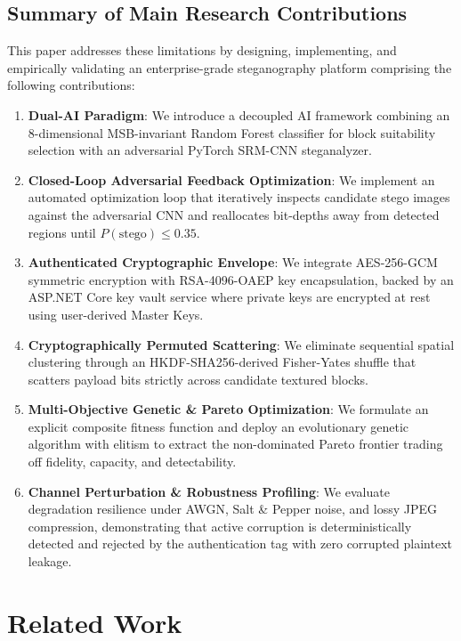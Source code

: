 \documentclass[conference]{IEEEtran}
\begin{document}
\subsection{Summary of Main Research Contributions}
This paper addresses these limitations by designing, implementing, and empirically validating an enterprise-grade steganography platform comprising the following contributions:
\begin{enumerate}
    \item \textbf{Dual-AI Paradigm}: We introduce a decoupled AI framework combining an 8-dimensional MSB-invariant Random Forest classifier for block suitability selection with an adversarial PyTorch SRM-CNN steganalyzer.
    \item \textbf{Closed-Loop Adversarial Feedback Optimization}: We implement an automated optimization loop that iteratively inspects candidate stego images against the adversarial CNN and reallocates bit-depths away from detected regions until $P(\text{stego}) \le 0.35$.
    \item \textbf{Authenticated Cryptographic Envelope}: We integrate AES-256-GCM symmetric encryption with RSA-4096-OAEP key encapsulation, backed by an ASP.NET Core key vault service where private keys are encrypted at rest using user-derived Master Keys.
    \item \textbf{Cryptographically Permuted Scattering}: We eliminate sequential spatial clustering through an HKDF-SHA256-derived Fisher-Yates shuffle that scatters payload bits strictly across candidate textured blocks.
    \item \textbf{Multi-Objective Genetic \& Pareto Optimization}: We formulate an explicit composite fitness function and deploy an evolutionary genetic algorithm with elitism to extract the non-dominated Pareto frontier trading off fidelity, capacity, and detectability.
    \item \textbf{Channel Perturbation \& Robustness Profiling}: We evaluate degradation resilience under AWGN, Salt \& Pepper noise, and lossy JPEG compression, demonstrating that active corruption is deterministically detected and rejected by the authentication tag with zero corrupted plaintext leakage.
\end{enumerate}

\section{Related Work}
\end{document}
